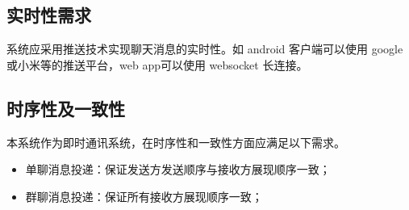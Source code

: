 % 
% 
% 
% 
% 
% 
% 
% 
% 
% 

\subsection{实时性需求}

系统应采用推送技术实现聊天消息的实时性。如 android 客户端可以使用 google 或小米等的推送平台，web app可以使用 websocket 长连接。

{\color{red}
\subsection{时序性及一致性}
本系统作为即时通讯系统，在时序性和一致性方面应满足以下需求。
\begin{itemize}
	\item 单聊消息投递：保证发送方发送顺序与接收方展现顺序一致；
	\item 群聊消息投递：保证所有接收方展现顺序一致；
\end{itemize}
}

